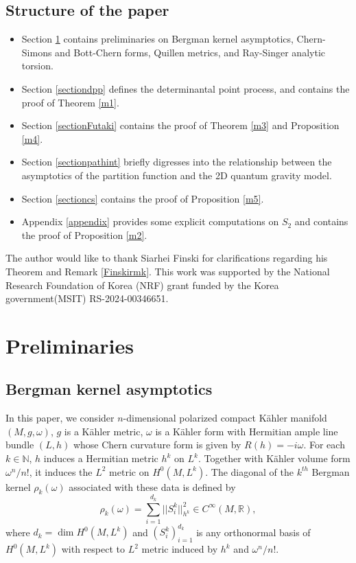 \documentclass[12pt,reqno,a4paper]{amsart}
\numberwithin{equation}{section}
\theoremstyle{remark}
\newenvironment{Ack}{\medskip\noindent{\it Acknowledgements:\/} }{\medskip}
\theoremstyle{dotless}
\begin{document}
\subsection{Structure of the paper}

\begin{itemize}
  \item Section \ref{sectionprelim} contains preliminaries on Bergman kernel asymptotics, Chern-Simons and Bott-Chern forms, Quillen metrics, and Ray-Singer analytic torsion. 
  \item Section \ref{sectiondpp} defines the determinantal point process, and contains the proof of Theorem \ref{m1}.
  \item Section \ref{sectionFutaki} contains the proof of Theorem \ref{m3} and Proposition \ref{m4}.
  \item Section \ref{sectionpathint} briefly digresses into the relationship between the asymptotics of the partition function and the 2D quantum gravity model.
  \item Section \ref{sectioncs} contains the proof of Proposition \ref{m5}.
  \item Appendix \ref{appendix} provides some explicit computations on $S_2$ and contains the proof of Proposition \ref{m2}.
\end{itemize}

\begin{Ack}
The author would like to thank Siarhei Finski for clarifications regarding his Theorem and Remark \ref{Finskirmk}.
This work was supported by the National Research Foundation of Korea (NRF) grant funded by the Korea government(MSIT) RS-2024-00346651.
\end{Ack}

\section{Preliminaries}\label{sectionprelim}

\subsection{Bergman kernel asymptotics}
In this paper, we consider $n$-dimensional polarized compact K\"ahler manifold $(M,g,\omega)$, $g$ is a K\"ahler metric, $\omega$ is a K\"ahler form with Hermitian ample line bundle $(L,h)$ whose Chern curvature form is given by $R(h)=-i\omega$. For each $k\in\mathbb{N}$, $h$ induces a Hermitian metric $h^k$ on $L^k$.
Together with K\"ahler volume form $\omega^n/n!$, it induces the $L^2$ metric on $H^0(M,L^k)$. The diagonal of the $k^{th}$ Bergman kernel $\rho_k(\omega)$ associated with these data is defined by
\begin{equation*}
\rho_k(\omega)=\sum_{i=1}^{d_k} ||S_i^k||_{h^k}^2 \in C^\infty(M,\mathbb{R}),
\end{equation*}
where $d_k=\dim H^0(M,L^k)$ and $\left(S_i^k\right)_{i=1}^{d_k}$ is any orthonormal basis of $H^0(M,L^k)$ with respect to $L^2$ metric induced by $h^k$ and $\omega^n/n!$. 
\end{document}
